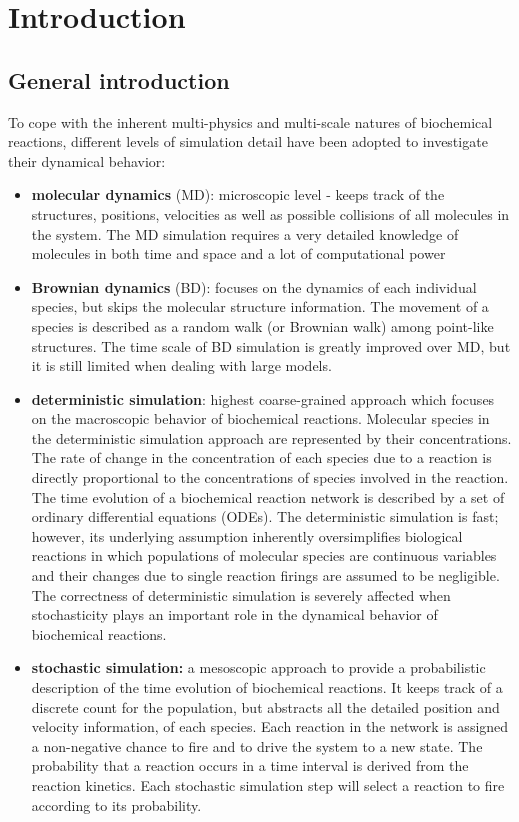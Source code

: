 \graphicspath{{chapters/01/}}
\chapter{Introduction}

\hypertarget{general-introduction}{%
\section{General introduction}\label{general-introduction}}

To cope with the inherent multi-physics and multi-scale natures of
biochemical reactions, different levels of simulation detail have been
adopted to investigate their dynamical behavior:

\begin{itemize}
\tightlist
\item
  \textbf{molecular dynamics} (MD): microscopic level - keeps track of
  the structures, positions, velocities as well as possible collisions
  of all molecules in the system. The MD simulation requires a very
  detailed knowledge of molecules in both time and space and a lot of
  computational power
\item
  \textbf{Brownian dynamics} (BD): focuses on the dynamics of each
  individual species, but skips the molecular structure information. The
  movement of a species is described as a random walk (or Brownian walk)
  among point-like structures. The time scale of BD simulation is
  greatly improved over MD, but it is still limited when dealing with
  large models.
\item
  \textbf{deterministic simulation}: highest coarse-grained approach
  which focuses on the macroscopic behavior of biochemical reactions.
  Molecular species in the deterministic simulation approach are
  represented by their concentrations. The rate of change in the
  concentration of each species due to a reaction is directly
  proportional to the concentrations of species involved in the
  reaction. The time evolution of a biochemical reaction network is
  described by a set of ordinary differential equations (ODEs). The
  deterministic simulation is fast; however, its underlying assumption
  inherently oversimplifies biological reactions in which populations of
  molecular species are continuous variables and their changes due to
  single reaction firings are assumed to be negligible. The correctness
  of deterministic simulation is severely affected when stochasticity
  plays an important role in the dynamical behavior of biochemical
  reactions.
\item
  \textbf{stochastic simulation:} a mesoscopic approach to provide a
  probabilistic description of the time evolution of biochemical
  reactions. It keeps track of a discrete count for the population, but
  abstracts all the detailed position and velocity information, of each
  species. Each reaction in the network is assigned a non-negative
  chance to fire and to drive the system to a new state. The probability
  that a reaction occurs in a time interval is derived from the reaction
  kinetics. Each stochastic simulation step will select a reaction to
  fire according to its probability.
\end{itemize}

